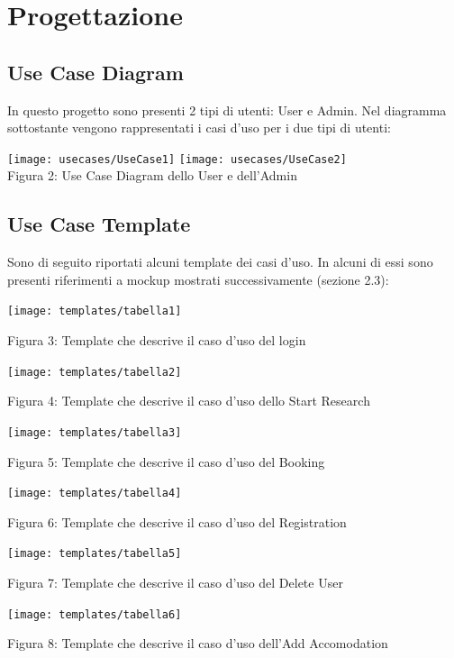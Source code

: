 \documentclass[10pt]{article}
\begin{document}
\section{Progettazione}
\subsection{Use Case Diagram}

In questo progetto sono presenti 2 tipi di utenti: User e Admin. Nel diagramma sottostante vengono rappresentati i casi d'uso per i due tipi di utenti: 

\begin{center}
\texttt{[image: usecases/UseCase1]}
\texttt{[image: usecases/UseCase2]}\\
Figura 2: Use Case Diagram dello User e dell'Admin
\end{center}

\subsection{Use Case Template}
Sono di seguito riportati alcuni template dei casi d'uso. In alcuni di essi sono presenti riferimenti a mockup mostrati successivamente (sezione 2.3):

\begin{center}
\texttt{[image: templates/tabella1]}
\par\medskip
Figura 3: Template che descrive il caso d'uso del login
\par\medskip
\texttt{[image: templates/tabella2]}
\par\medskip
Figura 4: Template che descrive il caso d'uso dello Start Research
\par\medskip
\texttt{[image: templates/tabella3]}
\par\medskip
Figura 5: Template che descrive il caso d'uso del Booking
\par\medskip
\texttt{[image: templates/tabella4]}
\par\medskip
Figura 6: Template che descrive il caso d'uso del Registration
\par\medskip
\texttt{[image: templates/tabella5]}
\par\medskip
Figura 7: Template che descrive il caso d'uso del Delete User
\par\medskip
\texttt{[image: templates/tabella6]}
\par\medskip
Figura 8: Template che descrive il caso d'uso dell'Add Accomodation
\par\medskip
\end{center}
\end{document}
